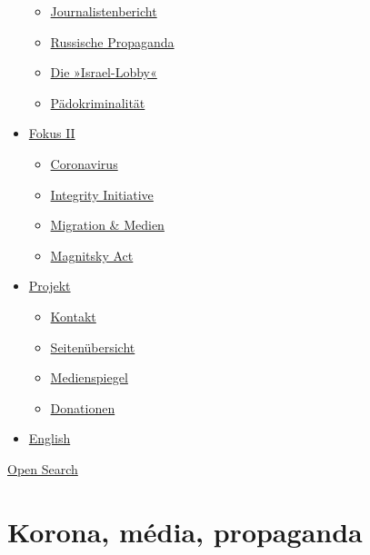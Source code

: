 \begin{itemize}
  \begin{itemize}
  \tightlist
  \item
    \href{https://swprs.org/bericht-eines-journalisten/}{Journalistenbericht}
  \item
    \href{https://swprs.org/russische-propaganda/}{Russische Propaganda}
  \item
    \href{https://swprs.org/die-israel-lobby-fakten-und-mythen/}{Die
    »Israel-Lobby«}
  \item
    \href{https://swprs.org/geopolitik-und-paedokriminalitaet/}{Pädokriminalität}
  \end{itemize}
\item
  \href{https://swprs.org/migration-und-medien/}{Fokus II}

  \begin{itemize}
  \tightlist
  \item
    \href{https://swprs.org/covid-19-hinweis-ii/}{Coronavirus}
  \item
    \href{https://swprs.org/die-integrity-initiative/}{Integrity
    Initiative}
  \item
    \href{https://swprs.org/migration-und-medien/}{Migration \& Medien}
  \item
    \href{https://swprs.org/der-fall-magnitsky/}{Magnitsky Act}
  \end{itemize}
\item
  \href{https://swprs.org/kontakt/}{Projekt}

  \begin{itemize}
  \tightlist
  \item
    \href{https://swprs.org/kontakt/}{Kontakt}
  \item
    \href{https://swprs.org/uebersicht/}{Seitenübersicht}
  \item
    \href{https://swprs.org/medienspiegel/}{Medienspiegel}
  \item
    \href{https://swprs.org/donationen/}{Donationen}
  \end{itemize}
\item
  \href{https://swprs.org/contact/}{English}
\end{itemize}

\protect\hyperlink{}{Open Search}

\hypertarget{korona-muxe9dia-propaganda}{%
\section{Korona, média, propaganda}\label{korona-muxe9dia-propaganda}}

